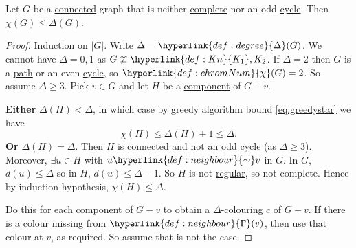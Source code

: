 \documentclass{article}
\begin{document}
\begin{nthm}\label{thm:28}
    Let $G$ be a \hyperlink{def:components}{connected} graph that is neither \hyperlink{def:Kn}{complete} nor an odd \hyperlink{def:Cn}{cycle}.
    Then $\chi(G) \leq \Delta(G)$.
\end{nthm}
\begin{proof}
    Induction on \hyperlink{def:order}{$|G|$}. Write $\Delta = \hyperlink{def:degree}{\Delta}(G)$.
    We cannot have $\Delta = 0,1$ as $G \ncong \hyperlink{def:Kn}{K_1}, K_2$.
    If $\Delta = 2$ then $G$ is a \hyperlink{def:Pn}{path} or an even \hyperlink{def:Cn}{cycle}, so $\hyperlink{def:chromNum}{\chi}(G) = 2$.
    So assume $\Delta \geq 3$. Pick $v \in G$ and let $H$ be a \hyperlink{def:components}{component} of $G - v$.

    \textbf{Either} $\Delta(H) < \Delta$, in which case by greedy algorithm bound \eqref{eq:greedystar} we have \begin{equation*}\chi(H) \leq \Delta(H) + 1 \leq \Delta.\end{equation*}
    \textbf{Or} $\Delta(H) = \Delta$. Then $H$ is connected and not an odd cycle (as $\Delta \geq 3$).
    Moreover, $\exists u \in H$ with $u \hyperlink{def:neighbour}{\sim} v$ in $G$.
    In $G$, $d(u) \leq \Delta$ so in $H$, $d(u) \leq \Delta - 1$.
    So $H$ is not \hyperlink{def:regular}{regular}, so not complete.
    Hence by induction hypothesis, $\chi(H) \leq \Delta$.

    Do this for each component of $G - v$ to obtain a $\Delta$-\hyperlink{def:colour}{colouring} $c$ of $G - v$.
    If there is a colour missing from $\hyperlink{def:neighbour}{\Gamma}(v)$, then use that colour at $v$, as required.
    So assume that is not the case.


\end{proof}
\end{document}
